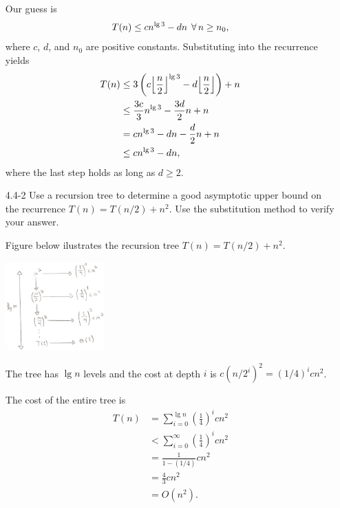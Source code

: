 \begin{enumerate}
\begin{framed}
Our guess is
\[
T(n) \le c n^{\lg 3} - dn \; \operatorname{\forall} n \ge n_0,
\]
where $c$, $d$, and $n_0$ are positive constants. Substituting into the
recurrence yields
\begin{equation*}
\begin{aligned}
  T(n) &\le 3 \left(c {\Bigl\lfloor\frac{n}{2}\Bigl\rfloor}^{\lg 3} - d {\Bigl\lfloor\frac{n}{2}\Bigl\rfloor}\right) + n\\
       &\le \frac{3c}{3} n^{\lg 3} - \frac{3d}{2}n + n\\
       &= c n^{\lg 3} - dn - \frac{d}{2}n + n\\
       &\le c n^{\lg 3} - dn,
\end{aligned}
\end{equation*}
where the last step holds as long as $d \ge 2$.
\end{framed}

\newpage

\item[4.4{-}2]{Use a recursion tree to determine a good asymptotic upper bound
on the recurrence $T(n) = T(n/2) + n^2$. Use the substitution method to verify
your answer.}

\begin{framed}
Figure below ilustrates the recursion tree $T(n) = T(n/2) + n^2$.

\begin{center}
\includegraphics[width=0.3\textwidth]{images/4_4_2_1.pdf}
\end{center}

The tree has $\lg n$ levels and the cost at depth $i$ is
$c(n/2^i)^2 = (1/4)^i cn^2$.

The cost of the entire tree is
\begin{equation*}
\begin{aligned}
T(n) &= \sum_{i = 0}^{\lg n} \left(\frac{1}{4}\right)^i cn^2\\
     &< \sum_{i = 0}^{\infty} \left(\frac{1}{4}\right)^i cn^2\\
     &= \frac{1}{1 - (1/4)} cn^2\\
     &= \frac{4}{3} cn^2\\
     &= O(n^2).
\end{aligned}
\end{equation*}


\end{framed}
\end{enumerate}
